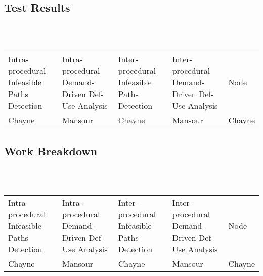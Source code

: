 \documentclass{article}
\begin{document}
\subsection{Test Results}
~\\~
\begin{adjustbox}{center}
\renewcommand{\arraystretch}{2}
\begin{tabular}{| C{3cm} | C{3cm} | C{3cm} | C{3cm} | C{3cm} |}
\hline
Intra-procedural Infeasible Paths Detection & Intra-procedural Demand-Driven Def-Use Analysis & Inter-procedural Infeasible Paths Detection  & Inter-procedural Demand-Driven Def-Use Analysis & Node \\  
Chayne & Mansour & Chayne & Mansour & Chayne \\ 

\end{tabular}
\end{adjustbox}

\subsection{Work Breakdown}
~\\~
\begin{adjustbox}{center}
\renewcommand{\arraystretch}{2}
\begin{tabular}{| C{3cm} | C{3cm} | C{3cm} | C{3cm} | C{3cm} |}
\hline
Intra-procedural Infeasible Paths Detection & Intra-procedural Demand-Driven Def-Use Analysis & Inter-procedural Infeasible Paths Detection  & Inter-procedural Demand-Driven Def-Use Analysis & Node \\  
Chayne & Mansour & Chayne & Mansour & Chayne \\ 

\end{tabular}
\end{adjustbox}
\end{document}

